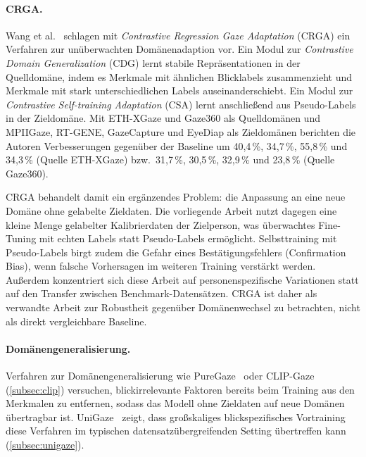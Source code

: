 \documentclass[
  11pt,
  a4paper,
  oneside,
  DIV=12,                 %
  BCOR=8mm,               %
  parskip=half,           %
  headings=normal,
  bibliography=totoc,     %
  listof=totoc            %
]{scrreprt}
\begin{document}
\paragraph{CRGA.}
Wang et al.~\cite{wang2022crga} schlagen mit \emph{Contrastive Regression Gaze Adaptation} (CRGA) ein Verfahren zur unüberwachten Domänenadaption vor. Ein Modul zur \emph{Contrastive Domain Generalization} (CDG) lernt stabile Repräsentationen in der Quelldomäne, indem es Merkmale mit ähnlichen Blicklabels zusammenzieht und Merkmale mit stark unterschiedlichen Labels auseinanderschiebt. Ein Modul zur \emph{Contrastive Self-training Adaptation} (CSA) lernt anschließend aus Pseudo-Labels in der Zieldomäne. Mit ETH-XGaze und Gaze360 als Quelldomänen und MPIIGaze, RT-GENE, GazeCapture und EyeDiap als Zieldomänen berichten die Autoren Verbesserungen gegenüber der Baseline um 40,4\,\%, 34,7\,\%, 55,8\,\% und 34,3\,\% (Quelle ETH-XGaze) bzw.\ 31,7\,\%, 30,5\,\%, 32,9\,\% und 23,8\,\% (Quelle Gaze360).

CRGA behandelt damit ein ergänzendes Problem: die Anpassung an eine neue Domäne ohne gelabelte Zieldaten. Die vorliegende Arbeit nutzt dagegen eine kleine Menge gelabelter Kalibrierdaten der Zielperson, was überwachtes Fine-Tuning mit echten Labels statt Pseudo-Labels ermöglicht. Selbsttraining mit Pseudo-Labels birgt zudem die Gefahr eines Bestätigungsfehlers (Confirmation Bias), wenn falsche Vorhersagen im weiteren Training verstärkt werden. Außerdem konzentriert sich diese Arbeit auf personenspezifische Variationen statt auf den Transfer zwischen Benchmark-Datensätzen. CRGA ist daher als verwandte Arbeit zur Robustheit gegenüber Domänenwechsel zu betrachten, nicht als direkt vergleichbare Baseline.

\paragraph{Domänengeneralisierung.}
Verfahren zur Domänengeneralisierung wie PureGaze~\cite{cheng2022puregaze} oder CLIP-Gaze~\cite{yin2024clipgaze} (\cref{subsec:clip}) versuchen, blickirrelevante Faktoren bereits beim Training aus den Merkmalen zu entfernen, sodass das Modell ohne Zieldaten auf neue Domänen übertragbar ist. UniGaze~\cite{qin2026unigaze} zeigt, dass großskaliges blickspezifisches Vortraining diese Verfahren im typischen datensatzübergreifenden Setting übertreffen kann (\cref{subsec:unigaze}).
\end{document}
